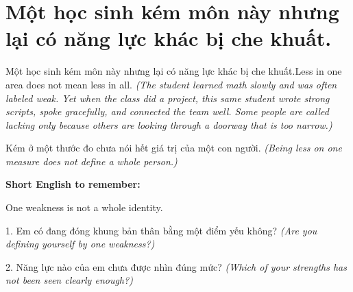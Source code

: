 \section{Một học sinh kém môn này nhưng lại có năng lực khác bị che khuất.}
\begin{truyen}{Một học sinh kém môn này nhưng lại có năng lực khác bị che khuất.}{Less in one area does not mean less in all.}
\textit{(The student learned math slowly and was often labeled weak. Yet when the class did a project, this same student wrote strong scripts, spoke gracefully, and connected the team well. Some people are called lacking only because others are looking through a doorway that is too narrow.)}
\end{truyen}
\begin{baihoc}
Kém ở một thước đo chưa nói hết giá trị của một con người.
\textit{(Being less on one measure does not define a whole person.)}
\end{baihoc}
\begin{ghinhoanh}
\textbf{Short English to remember:}

One weakness is not a whole identity.
\end{ghinhoanh}
\begin{tuhocnhanh}
1. Em có đang đóng khung bản thân bằng một điểm yếu không? \textit{(Are you defining yourself by one weakness?)}

2. Năng lực nào của em chưa được nhìn đúng mức? \textit{(Which of your strengths has not been seen clearly enough?)}
\end{tuhocnhanh}
\ngancach

